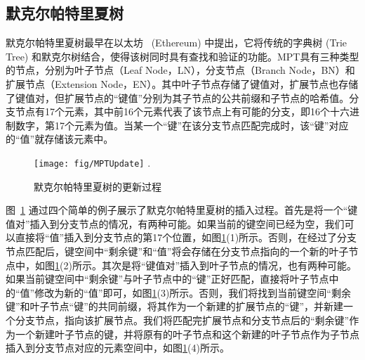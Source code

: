 \subsection{默克尔帕特里夏树}
默克尔帕特里夏树最早在以太坊~ \cite{wood2014ethereum, merkle_patricia_tree} (Ethereum) 中提出，它将传统的字典树 (Trie Tree) 和默克尔树结合，使得该树同时具有查找和验证的功能。MPT具有三种类型的节点，分别为叶子节点（Leaf Node，LN），分支节点（Branch Node，BN）和扩展节点（Extension Node，EN）。其中叶子节点存储了键值对，扩展节点也存储了键值对，但扩展节点的“键值”分别为其子节点的公共前缀和子节点的哈希值。分支节点有17个元素，其中前16个元素代表了该节点上有可能的分支，即16个十六进制数字，第17个元素为值。当某一个“键”在该分支节点匹配完成时，该“键”对应的“值”就存储该元素中。

\begin{figure}[t]
\centering
\texttt{[image: fig/MPTUpdate]}
\DeclareGraphicsExtensions.
\caption{默克尔帕特里夏树的更新过程}
\label{fig:MPTUpdate}
\end{figure}

图~\ref{fig:MPTUpdate} 通过四个简单的例子展示了默克尔帕特里夏树的插入过程。首先是将一个“键值对”插入到分支节点的情况，有两种可能。如果当前的键空间已经为空，我们可以直接将“值”插入到分支节点的第17个位置，如图\ref{fig:MPTUpdate}(1)所示。否则，在经过了分支节点匹配后，键空间中“剩余键”和“值”将会存储在分支节点指向的一个新的叶子节点中，如图\ref{fig:MPTUpdate}(2)所示。其次是将“键值对”插入到叶子节点的情况，也有两种可能。如果当前键空间中“剩余键”与叶子节点中的“键”正好匹配，直接将叶子节点中的“值”修改为新的“值”即可，如图\ref{fig:MPTUpdate}(3)所示。否则，我们将找到当前键空间“剩余键”和叶子节点“键”的共同前缀，将其作为一个新建的扩展节点的“键”，并新建一个分支节点，指向该扩展节点。我们将匹配完扩展节点和分支节点后的“剩余键”作为一个新建叶子节点的键，并将原有的叶子节点和这个新建的叶子节点作为子节点插入到分支节点对应的元素空间中，如图\ref{fig:MPTUpdate}(4)所示。

